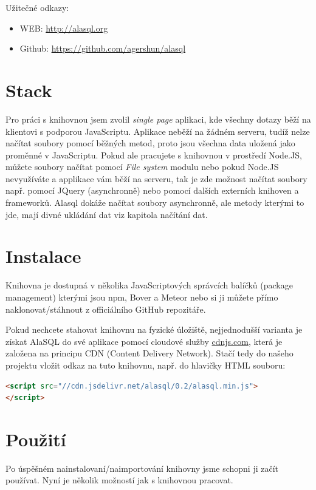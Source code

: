 \documentclass[a4, titlepage]{article}
\begin{document}
Užitečné odkazy:
\begin{itemize}
	\item WEB: \url{http://alasql.org}
	\item Github: \url{https://github.com/agershun/alasql}
\end{itemize}

\section{Stack}
Pro práci s knihovnou jsem zvolil \textit{single page} aplikaci, kde všechny dotazy běží na klientovi s podporou JavaScriptu. Aplikace neběží na žádném serveru, tudíž nelze načítat soubory pomocí běžných metod, proto jsou všechna data uložená jako proměnné v JavaScriptu. Pokud ale pracujete s knihovnou v prostředí Node.JS, můžete soubory načítat pomocí \textit{File system} modulu nebo pokud Node.JS nevyužíváte a applikace vám běží na serveru, tak je zde možnost načítat soubory např. pomocí JQuery (asynchronně) nebo pomocí dalších externích knihoven a frameworků. Alasql dokáže načítat soubory asynchronně, ale metody kterými to jde, mají divné ukládání dat viz kapitola načítání dat.

\section{Instalace}
Knihovna je dostupná v několika JavaScriptových správcích balíčků (package management) kterými jsou npm, Bover a Meteor nebo si ji můžete přímo naklonovat/stáhnout z officiálního GitHub repozitáře. 

Pokud nechcete stahovat knihovnu na fyzické úložiště, nejjednodušší varianta je získat AlaSQL do své aplikace pomocí cloudové služby \href{https://cdnjs.com/libraries/alasql}{cdnjs.com}, která je založena na principu CDN (Content Delivery Network). Stačí tedy do našeho projektu vložit odkaz na tuto knihovnu, např. do hlavičky HTML souboru:

\begin{lstlisting}[language=HTML]
<script src="//cdn.jsdelivr.net/alasql/0.2/alasql.min.js">
</script> 
\end{lstlisting}


\section{Použití}
Po úspěšném nainstalovaní/naimportování knihovny jsme schopni ji začít používat. Nyní je několik možností jak s knihovnou pracovat. 
\end{document}
